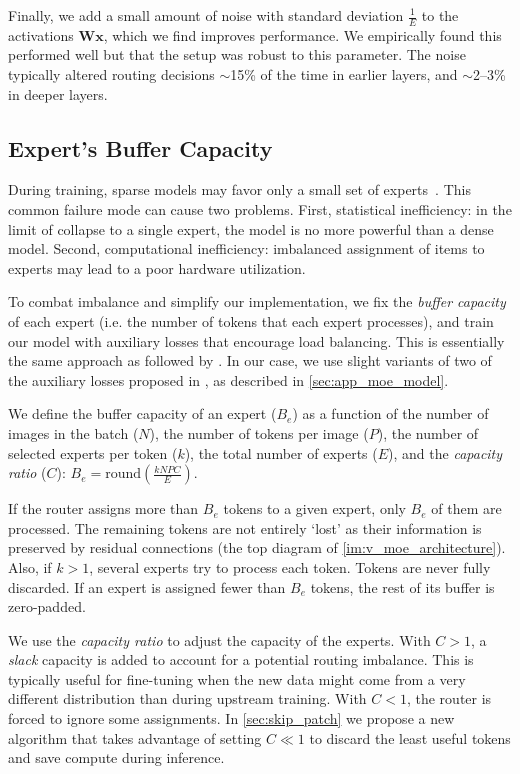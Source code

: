 \documentclass{article}
\begin{document}
Finally, we add a small amount of noise with standard deviation $\frac{1}{E}$ to the activations $\mathbf{W}\mathbf{x}$, which we find improves performance.
We empirically found this performed well but that the setup was robust to this parameter.
The noise typically altered routing decisions $\sim$15\% of the time in earlier layers, and $\sim$2--3\% in deeper layers.


\subsection{Expert's Buffer Capacity}
\label{sec:expert_capacity}
During training, sparse models may favor only a small set of experts~\cite{hansen1999combining,rosenbaum2019routing}.
This common failure mode can cause two problems.
First, statistical inefficiency: in the limit of collapse to a single expert, the model is no more powerful than a dense model.
Second, computational inefficiency: imbalanced assignment of items to experts may lead to a poor hardware utilization.

To combat imbalance and simplify our implementation, we fix the \emph{buffer capacity} of each expert 
(i.e. the number of tokens that each expert processes), 
and train our model with auxiliary losses that encourage load balancing. This is essentially the same approach as followed by
\cite{shazeer2017outrageously,lepikhin2020gshard,fedus2021switch}. In our case, we use slight variants of two of the auxiliary 
losses proposed in \cite{shazeer2017outrageously}, as described in \cref{sec:app_moe_model}. 

We define the buffer capacity of an expert ($B_e$) as a function of the number of images in the batch ($N$), the number of tokens 
per image ($P$),  the number of selected experts per token ($k$), the total number of experts ($E$), and the \emph{capacity ratio} ($C$):
$B_e = \text{round}\left(\frac{k N P C}{E}\right)$.

If the router assigns more than $B_e$ tokens to a given expert, only $B_e$ of them are processed.
The remaining tokens are not entirely `lost' as their information is preserved by residual connections (the 
top diagram of \cref{im:v_moe_architecture}).
Also, if $k > 1$, several experts try to process each token.
Tokens are never fully discarded.
If an expert is assigned fewer than $B_e$ tokens, the rest of its buffer is zero-padded. 

We use the \emph{capacity ratio} to adjust the capacity of the experts. With $C > 1$, a \emph{slack} capacity is added to account for a potential 
routing imbalance. This is typically useful for fine-tuning when the new data might come from a very different distribution than during upstream training. 
With $C < 1$, the router is forced to ignore some assignments. In \cref{sec:skip_patch} we propose a new algorithm that takes 
advantage of setting $C \ll 1$ to discard the least useful tokens and save compute during inference.
\end{document}
